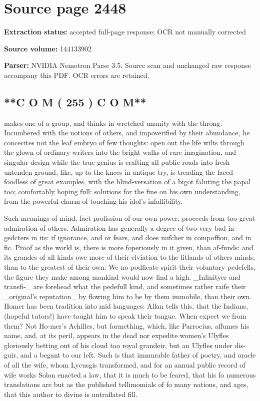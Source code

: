 \clearpage
\section{Source page 2448}
\textbf{Extraction status:} accepted full-page response; OCR not manually corrected\par
\textbf{Source volume:} 144133902\par
\textbf{Parser:} NVIDIA Nemotron Parse 3.5. Source scan and unchanged raw response accompany this PDF. OCR errors are retained.\par\medskip
\subsection*{**C O M ( 255 ) C O M**}
makes one of a group, and thinks in wretched unanity with the throng. Incumbered with the notions of others, and impoverified by their abundance, he concecites not the leaf embryo of few thoughts: open out the life wilts through the glown of ordinary writers into the bright walks of rare imagination, and singular design while the true genius is crafting all public roads into fresh untenden ground, like, up to the knees in antique try, is treading the faced foodless of great examples, with the blind-versation of a bigot faluting the papal too; comfortably hoping full: solutions for the fine on his own understanding, from the powerful charm of touching his idol's infallibility.\par\medskip
Such meanings of mind, fact profission of our own power, proceeds from too great admiration of others. Admiration has generally a degree of two very bad in-gedcters in its: if ignorance, and or fears, and does mifcher in compoffion, and in fic. Proof as the world is, there is more foperiously in it given, than af-funds: and its grandes of all kinds owe more of their elviation to the litlands of others minds, than to the greatest of their own. We no podficate spirit their voluntary pedefells, the figure they make among mankind would now find a high. \_Infinityer and transfi-\_ are forehead what the pedefull kind, and sometimes rather raife their \_original’s reputation\_ by flowing him to be by them immobile, than their own. Homer has been tradition into mid languages: Allan tells this, that the Indians, (hopeful tutors!) have taught him to speak their tongue. When expect we from them? Not Ho-mer's Achilles, but formething, which, like Parrocius, affumes his name, and, at its peril, appears in the dead nor expedite women’s Ulyfles gloriously betting out of his cloud too royal grandeir, but an Ulyfles under dis-guir, and a begant to our left. Such is that immurable father of poetry, and oracle of all the wife, whom Lycusgis transformed, and for an annual public record of wife works Solon enacted a law, that it is much to be feared, that his fo numerous translations are but as the published tellimomials of fo many nations, and ages, that this author to divine is untraflated fill.\par\medskip
